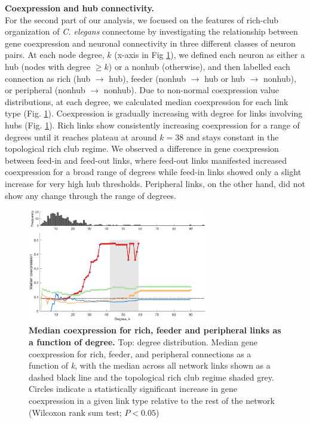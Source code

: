 \documentclass[10pt,letterpaper]{article}
\begin{document}
\textbf{Coexpression and hub connectivity.}\\
For the second part of our analysis, we focused on the features of rich-club organization of \textit{C. elegans} connectome by investigating the relationship between gene coexpression and neuronal connectivity in three different classes of neuron pairs.
At each node degree, $k$ (x-axis in Fig \ref{RCdegree}), we defined each neuron as either a hub (nodes with degree $\geq k$) or a nonhub (otherwise), and then labelled each connection as rich (hub $\rightarrow$ hub), feeder (nonhub $\rightarrow$ hub or hub $\rightarrow$ nonhub), or peripheral (nonhub $\rightarrow$ nonhub).
Due to non-normal coexpression value distributions, at each degree, we calculated median coexpression for each link type (Fig. \ref{RCdegree}).
Coexpression is gradually increasing with degree for links involving hubs (Fig. \ref{RCdegree}).
Rich links show consistently increasing coexpression for a range of degrees until it reaches plateau at around $k=38$ and stays constant in the topological rich club regime.
We observed a difference in gene coexpression between feed-in and feed-out links, where feed-out links manifested increased coexpression for a broad range of degrees while feed-in links showed only a slight increase for very high hub thresholds. 
Peripheral links, on the other hand, did not show any change through the range of degrees. 

 \begin{figure}[!h]
 \centering
    \includegraphics[width=0.7\textwidth]{MedianCoexpression.eps}
 \caption{{\bf Median coexpression for rich, feeder and peripheral links as a function of degree.}
Top: degree distribution. Median gene coexpression for rich, feeder, and peripheral connections as a function of \textit{k}, with the median across all network links shown as a dashed black line and the topological rich club regime shaded grey.
Circles indicate a statistically significant increase in gene coexpression in a given link type relative to the rest of the network (Wilcoxon rank sum test; $P < 0.05$)}
 \label{RCdegree}
 \end{figure}
\end{document}
